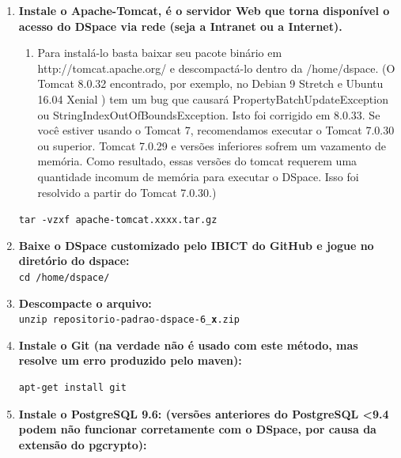 \documentclass[12pt,hidelinks]{article}
\begin{document}
\begin{enumerate}
\begin{enumerate}
        \end{enumerate}
        
        \item \textbf{Instale o Apache-Tomcat, é o servidor Web que torna disponível o acesso do DSpace via rede (seja a Intranet ou a Internet).} \\
    
        
        \begin{enumerate}
            \item Para instalá-lo basta baixar seu pacote binário em http://tomcat.apache.org/ e descompactá-lo dentro da /home/dspace. (O Tomcat 8.0.32 encontrado, por exemplo, no Debian 9 Stretch e Ubuntu 16.04 Xenial ) tem um bug que causará PropertyBatchUpdateException ou StringIndexOutOfBoundsException.   Isto foi corrigido em 8.0.33. Se você estiver usando o Tomcat 7, recomendamos executar o Tomcat 7.0.30 ou superior. Tomcat 7.0.29 e versões inferiores sofrem um vazamento de memória. Como resultado, essas versões do tomcat requerem uma quantidade incomum de memória para executar o DSpace. Isso foi resolvido a partir do Tomcat 7.0.30.)
        \end{enumerate}
        
                \texttt{tar -vzxf apache-tomcat.xxxx.tar.gz} \\
        
        \item \textbf{Baixe o DSpace customizado pelo IBICT do GitHub e jogue no diretório do dspace:}\\
        
            \texttt{cd /home/dspace/}\\
        
        \item \textbf{Descompacte o arquivo:}\\
        
            \texttt{unzip repositorio-padrao-dspace-6\_\textbf{x}.zip}\\
            
        \item \textbf{Instale o Git (na verdade não é usado com este método, mas resolve um erro produzido pelo maven):}\\    
            
            \begin{verbatim}
apt-get install git
            \end{verbatim}
            
        \item \textbf{Instale o PostgreSQL 9.6: (versões anteriores do PostgreSQL <9.4 podem não funcionar corretamente com o DSpace, por causa da extensão do pgcrypto):}\\
            

\end{enumerate}
\end{document}
